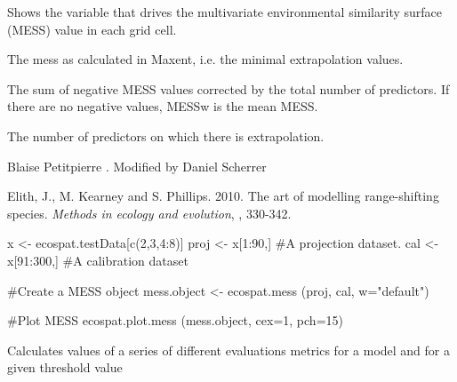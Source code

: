 \documentclass[a4paper]{book}
\begin{document}
%
\begin{Details}\relax
Shows the variable that drives the multivariate environmental similarity surface (MESS) value in each grid cell.
\end{Details}
%
\begin{Value}
\begin{ldescription}
\item[\code{MESS}] The mess as calculated in Maxent, i.e. the minimal extrapolation values.
\item[\code{MESSw}] The sum of negative MESS values corrected by the total number of predictors. If there are no negative values, MESSw is the mean MESS.
\item[\code{MESSneg}] The number of predictors on which there is extrapolation.
\end{ldescription}
\end{Value}
%
\begin{Author}\relax
Blaise Petitpierre . Modified by Daniel Scherrer 
\end{Author}
%
\begin{References}\relax
Elith, J., M. Kearney and S. Phillips. 2010. The art of modelling range-shifting species. \emph{Methods in ecology and evolution}, , 330-342.

\end{References}
%
\begin{SeeAlso}\relax
{}
\end{SeeAlso}
%
\begin{Examples}
\begin{ExampleCode}
x <- ecospat.testData[c(2,3,4:8)]
proj <- x[1:90,] #A projection dataset.
cal <- x[91:300,] #A calibration dataset

#Create a MESS object 
mess.object <- ecospat.mess (proj, cal, w="default")

#Plot MESS 
ecospat.plot.mess (mess.object, cex=1, pch=15)
\end{ExampleCode}
\end{Examples}
%
\begin{Description}\relax
Calculates values of a series of different evaluations metrics for a model and for a given threshold value

\end{Description}
\end{document}
